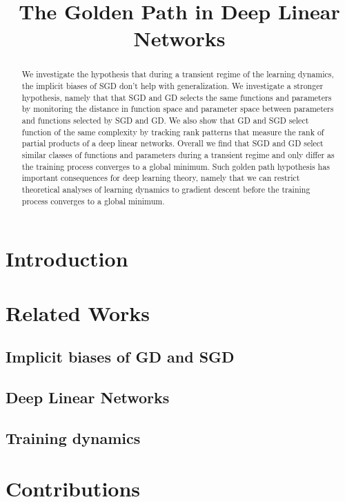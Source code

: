 \documentclass{article}
\title{The Golden Path in Deep Linear Networks}
\theoremstyle{definition}
\begin{document}
\maketitle
\begin{abstract}
    We investigate the hypothesis that during a transient regime of the learning dynamics, the implicit biases of SGD don't help with generalization. We investigate a stronger hypothesis, namely that that SGD and GD selects the same functions and parameters by monitoring the distance in function space and parameter space between parameters and functions selected by SGD and GD. We also show that GD and SGD select function of the same complexity by tracking rank patterns that measure the rank of partial products of a deep linear networks. Overall we find that SGD and GD select similar classes of functions and parameters during a transient regime and only differ as the training process converges to a global minimum. Such golden path hypothesis has important consequences for deep learning theory, namely that we can restrict theoretical analyses of learning dynamics to gradient descent before the training process converges to a global minimum. 
\end{abstract}
\section{Introduction}

\section{Related Works}
\subsection{Implicit biases of GD and SGD}

\subsection{Deep Linear Networks}

\subsection{Training dynamics}

\section{Contributions}
\end{document}
